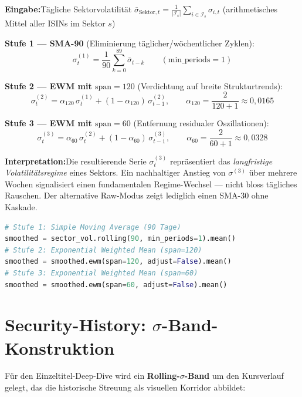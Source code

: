 \documentclass[11pt, a4paper, oneside, openany]{report}
\newcommand{\code}[1]{{\codefont\small\textcolor{DeepNavy}{#1}}}
\begin{document}
\begin{mathbox}
\textbf{Eingabe:}\;Tägliche Sektorvolatilität $\bar{\sigma}_{\text{Sektor},t} = \frac{1}{|\mathcal{I}_s|}\sum_{i \in \mathcal{I}_s} \sigma_{i,t}$ (arithmetisches Mittel aller ISINs im Sektor $s$)

\textbf{Stufe 1 --- SMA-90} (Eliminierung täglicher/wöchentlicher Zyklen):
\[
  \sigma_t^{(1)} = \frac{1}{90}\sum_{k=0}^{89} \bar{\sigma}_{t-k} \qquad (\text{min\_periods} = 1)
\]

\textbf{Stufe 2 --- EWM mit $\text{span}=120$} (Verdichtung auf breite Strukturtrends):
\[
  \sigma_t^{(2)} = \alpha_{120}\,\sigma_t^{(1)} + (1 - \alpha_{120})\,\sigma_{t-1}^{(2)}, \qquad \alpha_{120} = \frac{2}{120 + 1} \approx 0{,}0165
\]

\textbf{Stufe 3 --- EWM mit $\text{span}=60$} (Entfernung residualer Oszillationen):
\[
  \sigma_t^{(3)} = \alpha_{60}\,\sigma_t^{(2)} + (1 - \alpha_{60})\,\sigma_{t-1}^{(3)}, \qquad \alpha_{60} = \frac{2}{60 + 1} \approx 0{,}0328
\]

\textbf{Interpretation:}\;Die resultierende Serie $\sigma_t^{(3)}$ repräsentiert das \textit{langfristige Volatilitätsregime} eines Sektors. Ein nachhaltiger Anstieg von $\sigma^{(3)}$ über mehrere Wochen signalisiert einen fundamentalen Regime-Wechsel --- nicht bloss tägliches Rauschen. Der alternative Raw-Modus zeigt lediglich einen SMA-30 ohne Kaskade.
\end{mathbox}

\begin{lstlisting}[language=Python, caption={Dreistufige EWMA-Kaskade in Pandas (\code{charts.py})}]
# Stufe 1: Simple Moving Average (90 Tage)
smoothed = sector_vol.rolling(90, min_periods=1).mean()
# Stufe 2: Exponential Weighted Mean (span=120)
smoothed = smoothed.ewm(span=120, adjust=False).mean()
# Stufe 3: Exponential Weighted Mean (span=60)
smoothed = smoothed.ewm(span=60, adjust=False).mean()
\end{lstlisting}

\section{\texorpdfstring{Security-History: $\sigma$-Band-Konstruktion}{Security-History: Sigma-Band-Konstruktion}}
\label{sec:sigmaband}

Für den Einzeltitel-Deep-Dive wird ein \textbf{Rolling-$\sigma$-Band} um den Kursverlauf gelegt, das die historische Streuung als visuellen Korridor abbildet:
\end{document}
